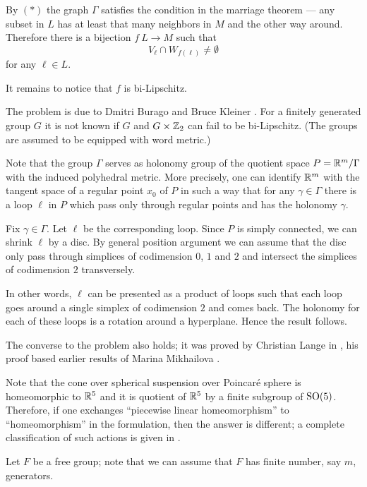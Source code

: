 By $({*})$ the graph $\Gamma$ satisfies the condition in the marriage theorem ---
any subset in $L$ has at least that many neighbors in $M$ and the other way around.
Therefore there is a bijection $f\: L\to M$ such that 
\[V_\ell\cap W_{f(\ell)}\ne\emptyset\] for any $\ell\in L$. 

It remains to notice that $f$ is bi-Lipschitz.
\qeds

The problem is due to 
Dmitri Burago 
and Bruce Kleiner \cite[see][]{burago-kleiner}. 
For a finitely generated group $G$  
it is not known if $G$ and $G\times \mathbb{Z}_2$ can fail to be bi-Lipschitz.
(The groups are assumed to be equipped with word metric.)
 



Note that the group $\Gamma$ serves as holonomy group of the quotient space $P=\mathbb{R}^m/\Gamma$ with the induced polyhedral metric.
More precisely, one can identify $\mathbb{R}^m$ with the tangent space of a regular point $x_0$ of $P$ in such a way that
for any $\gamma\in\Gamma$ there is a loop $\ell$ in $P$ which pass only through regular points and has the holonomy $\gamma$.

Fix $\gamma\in\Gamma$. 
Let $\ell$ be the corresponding loop.
Since $P$ is simply connected, we can shrink $\ell$ by a disc.
By general position argument we can assume that the disc 
only pass through simplices of codimension $0$, $1$ and $2$
and intersect the simplices of codimension $2$ transversely.

In other words, $\ell$ can be presented as a product of 
loops such that each loop goes around a single simplex of codimension $2$ and comes back.
The holonomy for each of these loops is a rotation around a hyperplane.
Hence the result follows.
\qeds

The converse to the problem also holds;
it was proved by Christian Lange in \cite{lange},
his proof based earlier results of 
Marina Mikhailova \cite[see][]{mikhailova}.

Note that the cone over spherical suspension over Poincar\'e sphere is homeomorphic to $\mathbb{R}^5$ and it is quotient of $\mathbb{R}^5$ by a finite subgroup of $\mathrm{SO}(5)$. 
Therefore, 
if one exchanges ``piecewise linear homeomorphism'' to ``homeomorphism'' in the formulation, 
then the answer is different; 
a complete classification of such actions is given in \cite{lange}.

Let $F$ be a free group;
note that we can assume that $F$ has finite number, say $m$, generators.



